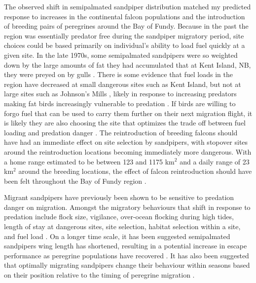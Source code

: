 The observed shift in semipalmated sandpiper distribution matched my predicted response to increases in the continental falcon populations and the introduction of breeding pairs of peregrines around the Bay of Fundy. Because in the past the region was essentially predator free during the sandpiper migratory period, site choices could be based primarily on individual's ability to load fuel quickly at a given site. In the late 1970s, some semipalmated sandpipers were so weighted down by the large amounts of fat they had accumulated that at Kent Island, NB, they were preyed on by gulls \citep{Lank1983}. There is some evidence that fuel loads in the region have decreased at small dangerous sites such as Kent Island, but not at large sites such as Johnson's Mills \citep{hope2010influence}, likely in response to increasing predators making fat birds increasingly vulnerable to predation \citep{burns_effects_2002}. If birds are willing to forgo fuel that can be used to carry them further on their next migration flight, it is likely they are also choosing the site that optimizes the trade off between fuel loading and predation danger \citep{Pomeroy2008a,Taylor2007}. The reintroduction of breeding falcons should have had an immediate effect on site selection by sandpipers, with stopover sites around the reintroduction locations becoming immediately more dangerous. With a home range estimated to be between 123 and 1175 km$^2$ and a daily range of 23 km$^2$ around the breeding locations, the effect of falcon reintroduction should have been felt throughout the Bay of Fundy region \citep{Enderson1997a,Jenkins1998,Ganusevich2004}. 


Migrant sandpipers have previously been shown to be sensitive to predation danger on migration. Amongst the migratory behaviours that shift in response to predation include flock size, vigilance, over-ocean flocking during high tides, length of stay at dangerous sites, site selection, habitat selection within a site, and fuel load \citep{Dekker1998,ydenberg_western_2004,pomeroy_tradeoffs_2006,Pomeroy2008a,Sprague2008a}. On a longer time scale, it has been suggested semipalmated sandpipers wing length has shortened, resulting in a potential increase in escape performance as peregrine populations have recovered \citep{Lank2017}. It has also been suggested that optimally migrating sandpipers change their behaviour within seasons based on their position relative to the timing of peregrine migration \citep{Hope2014,Hope2011}. 

